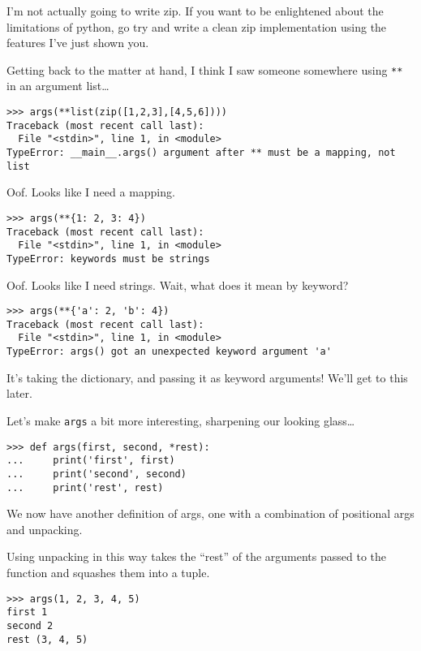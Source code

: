 \documentclass[11pt]{article}
\begin{document}
I'm not actually going to write zip. If you want to be enlightened
about the limitations of python, go try and write a clean zip
implementation using the features I've just shown you.

Getting back to the matter at hand, I think I saw someone somewhere
using \texttt{**} in an argument list\ldots{}
\begin{verbatim}
>>> args(**list(zip([1,2,3],[4,5,6])))
Traceback (most recent call last):
  File "<stdin>", line 1, in <module>
TypeError: __main__.args() argument after ** must be a mapping, not list
\end{verbatim}
Oof. Looks like I need a mapping. 
\begin{verbatim}
>>> args(**{1: 2, 3: 4})
Traceback (most recent call last):
  File "<stdin>", line 1, in <module>
TypeError: keywords must be strings
\end{verbatim}
Oof. Looks like I need strings. Wait, what does it mean by keyword? 
\begin{verbatim}
>>> args(**{'a': 2, 'b': 4})
Traceback (most recent call last):
  File "<stdin>", line 1, in <module>
TypeError: args() got an unexpected keyword argument 'a'
\end{verbatim}
It's taking the dictionary, and passing it as keyword arguments!
We'll get to this later.

Let's make \texttt{args} a bit more interesting, sharpening our looking
glass\ldots{}
\begin{verbatim}
>>> def args(first, second, *rest):
...     print('first', first)
...     print('second', second)
...     print('rest', rest)
\end{verbatim}
We now have another definition of args, one with a combination of
positional args and unpacking.

Using unpacking in this way takes the ``rest'' of the arguments passed
to the function and squashes them into a tuple.
\begin{verbatim}
>>> args(1, 2, 3, 4, 5)
first 1
second 2
rest (3, 4, 5)
\end{verbatim}
\end{document}
